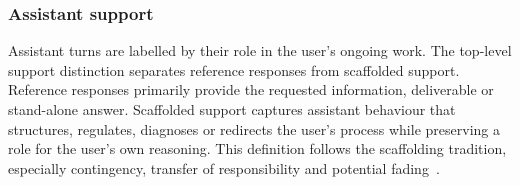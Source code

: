 


\subsubsection{Assistant support}

Assistant turns are labelled by their role in the user's ongoing work. The top-level support distinction separates reference responses from scaffolded support. Reference
responses primarily provide the requested information, deliverable or stand-alone answer. Scaffolded support captures assistant behaviour that structures, regulates, diagnoses or redirects the user's process while preserving a role for the user's own reasoning. This definition follows the scaffolding tradition, especially contingency, transfer of responsibility and potential fading~\cite{wood1976role,van2010scaffolding,quintana2018scaffolding,reiser2004scaffolding}.


